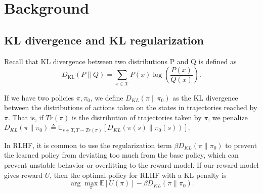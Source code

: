 \documentclass{article}
\begin{document}






\section{Background}

\subsection{KL divergence and KL regularization}

Recall that KL divergence between two distributions P and Q is defined as \[
D_{\mathrm{KL}}(P \| Q)=\sum_{x \in \mathcal{X}} P(x) \log \left(\frac{P(x)}{Q(x)}\right).
\]

If we have two policies $\pi, \pi_0$, we define $D_{KL}(\pi \| \pi_0)$ as the KL divergence between the distributions of actions taken on the states in trajectories reached by $\pi$. That is, if $Tr(\pi)$ is the distribution of trajectories taken by $\pi$, we penalize
\(D_{KL}(\pi \| \pi_0) \triangleq \mathbb E_{s \in T, T\sim Tr(\pi)}[D_{KL}(\pi(s) \| \pi_0(s))]\).

In RLHF, it is common to use the regularization term $\beta D_{KL}\left(\pi \| \pi_0 \right)$ to prevent the learned policy from deviating too much from the base policy, which can prevent unstable behavior or overfitting to the reward model. If our reward model gives reward $U$, then the optimal policy for RLHF with a KL penalty is
\[
\arg \max_{\pi} \mathbb{E} [U(\pi)]-\beta D_{KL}\left(\pi \| \pi_0 \right).
\]
\end{document}
